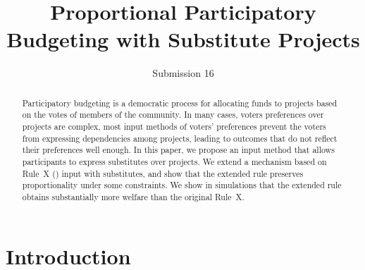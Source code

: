 \documentclass[runningheads]{llncs}
\newcommand{\kibitz}[2]{\ifnum\Comments=1{\color{#1}{#2}}\fi}
\newcommand{\rmr}[1]{\kibitz{red}{[Reshef says:#1]}}
\begin{document}
%
\title{Proportional Participatory Budgeting with Substitute Projects}
%
%

\author{Submission 16}
%
\institute{}
%
%
\maketitle              %
%
\begin{abstract}
Participatory budgeting is a democratic process for allocating funds to projects based on the votes of members of the community. \rmr{removed: The goal is to fund the projects   which are best for the community, according to voters' preferences.} In many cases, voters preferences over projects are complex, most input methods of voters' preferences  prevent the voters from expressing dependencies among projects, leading to outcomes that do not reflect their preferences well enough. In this paper, we propose an  input method that allows participants to express substitutes over projects.  We  extend a  mechanism based on Rule~X (\citet{peters2020proportional})  input with substitutes, and show that the extended rule preserves proportionality under some constraints. We show in simulations that the extended rule obtains  substantially more welfare than the original Rule~X.

\end{abstract}
%
%
%
\section{Introduction}
\end{document}
